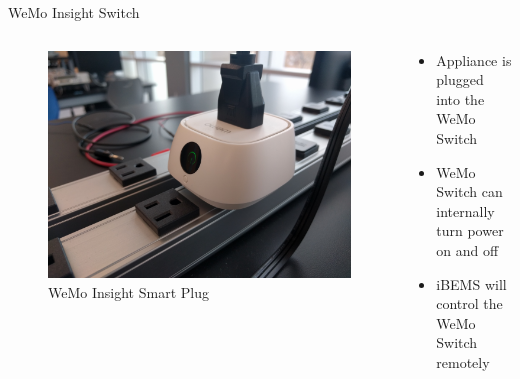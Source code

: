 \documentclass{beamer}
\begin{document}
\begin{frame}{WeMo Insight Switch}{} %
    \begin{columns}
      \begin{figure}
        \centering
        \includegraphics[scale=0.045]{figs/wemoView.jpg}
        \caption{WeMo Insight Smart Plug}
        \label{fig:wemo}
      \end{figure}
     \begin{block}{}
        \begin{itemize}
            \item Appliance is plugged into the WeMo Switch
            \item WeMo Switch can internally turn power on and off
            \item iBEMS will control the WeMo Switch remotely
        \end{itemize}
     \end{block}
    \end{columns}
\end{frame}
\end{document}
